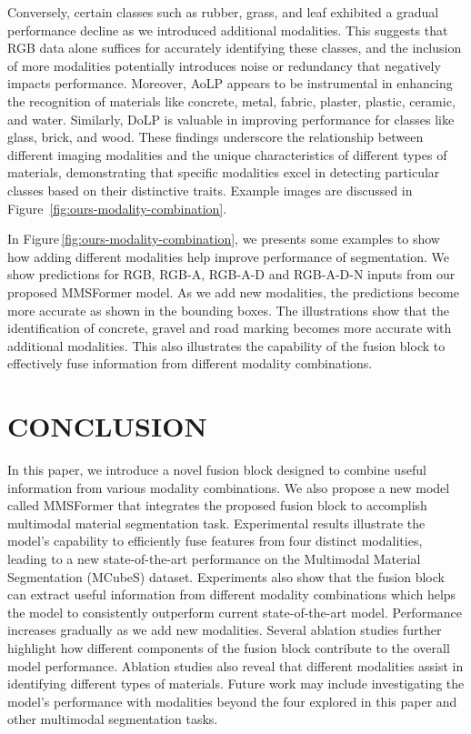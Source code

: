 \documentclass{article}
\begin{document}
Conversely, certain classes such as rubber, grass, and leaf exhibited a gradual performance decline as we introduced additional modalities. This suggests that RGB data alone suffices for accurately identifying these classes, and the inclusion of more modalities potentially introduces noise or redundancy that negatively impacts performance. Moreover, AoLP appears to be instrumental in enhancing the recognition of materials like concrete, metal, fabric, plaster, plastic, ceramic, and water. Similarly, DoLP is valuable in improving performance for classes like glass, brick, and wood. These findings underscore the relationship between different imaging modalities and the unique characteristics of different types of materials, demonstrating that specific modalities excel in detecting particular classes based on their distinctive traits. Example images are discussed in Figure~\ref{fig:ours-modality-combination}. 

In Figure\,\ref{fig:ours-modality-combination}, we presents some examples to show how adding different modalities help improve performance of segmentation. We show predictions for RGB, RGB-A, RGB-A-D and RGB-A-D-N inputs from our proposed MMSFormer model. As we add new modalities, the predictions become more accurate as shown in the bounding boxes. The illustrations show that the identification of concrete, gravel and road marking becomes more accurate with additional modalities. This also illustrates the capability of the fusion block to effectively fuse information from different modality combinations.




\section{CONCLUSION}
\label{sec:conclusion}
In this paper, we introduce a novel fusion block designed to combine useful information from various modality combinations. We also propose a new model called MMSFormer that integrates the proposed fusion block to accomplish multimodal material segmentation task. Experimental results illustrate the model's capability to efficiently fuse features from four distinct modalities, leading to a new state-of-the-art performance on the Multimodal Material Segmentation (MCubeS) dataset. Experiments also show that the fusion block can extract useful information from different modality combinations which helps the model to consistently outperform current state-of-the-art model. Performance increases gradually as we add new modalities. Several ablation studies further highlight how different components of the fusion block contribute to the overall model performance. Ablation studies also reveal that different modalities assist in identifying different types of materials. Future work may include investigating the model's performance with modalities beyond the four explored in this paper and other multimodal segmentation tasks. 


\ninept 


\end{document}
